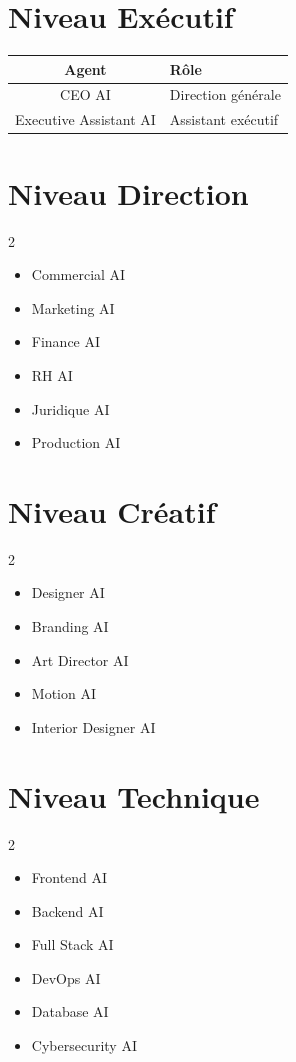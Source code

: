 \documentclass[12pt,a4paper,oneside]{book}
\begin{document}
\section{Niveau Exécutif}
\begin{center}
\begin{tabular}{|c|p{10cm}|}
\hline
\rowcolor{electronpurple}
\color{white}\textbf{Agent} & \color{white}\textbf{Rôle} \\
\hline
CEO AI & Direction générale \\
\hline
Executive Assistant AI & Assistant exécutif \\
\hline
\end{tabular}
\end{center}

\section{Niveau Direction}
\begin{multicols}{2}
\begin{itemize}
\item Commercial AI
\item Marketing AI
\item Finance AI
\item RH AI
\item Juridique AI
\item Production AI
\end{itemize}
\end{multicols}

\section{Niveau Créatif}
\begin{multicols}{2}
\begin{itemize}
\item Designer AI
\item Branding AI
\item Art Director AI
\item Motion AI
\item Interior Designer AI
\end{itemize}
\end{multicols}

\section{Niveau Technique}
\begin{multicols}{2}
\begin{itemize}
\item Frontend AI
\item Backend AI
\item Full Stack AI
\item DevOps AI
\item Database AI
\item Cybersecurity AI
\end{itemize}
\end{multicols}
\end{document}
